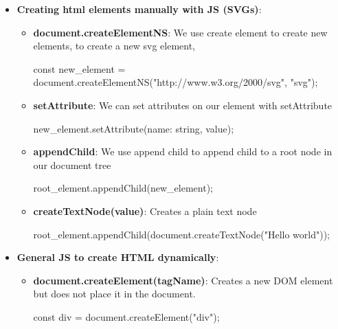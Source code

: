 \documentclass{report}
\begin{document}
\begin{itemize}
\begin{jscode}
                    f.x = 10;
                    f.y = 15;
                    \end{jscode}

        \item \textbf{Creating html elements manually with JS (SVGs)}:
            \begin{itemize}
                \item \textbf{document.createElementNS}: We use create element to create new elements, to create a new svg element,
                    \bigbreak \noindent 
                    \begin{jscode}
                    const new_element = document.createElementNS("http://www.w3.org/2000/svg", "svg");
                    \end{jscode}
                \item \textbf{setAttribute}: We can set attributes on our element with setAttribute
                    \bigbreak \noindent 
                    \begin{jscode}
                    new_element.setAttribute(name: string, value);
                    \end{jscode}
                \item \textbf{appendChild}: We use append child to append child to a root node in our document tree
                    \bigbreak \noindent 
                    \begin{jscode}
                        root_element.appendChild(new_element);
                    \end{jscode}
                \item \textbf{createTextNode(value)}: Creates a plain text node
                    \bigbreak \noindent 
                    \begin{jscode}
                    root_element.appendChild(document.createTextNode("Hello world"));
                    \end{jscode}
            \end{itemize}
        \item \textbf{General JS to create HTML dynamically}: 
            \begin{itemize}
                \item \textbf{document.createElement(tagName)}: Creates a new DOM element but does not place it in the document.
                    \bigbreak \noindent 
                    \begin{jscode}
                    const div = document.createElement("div");

\end{jscode}
\end{itemize}
\end{itemize}
\end{document}

